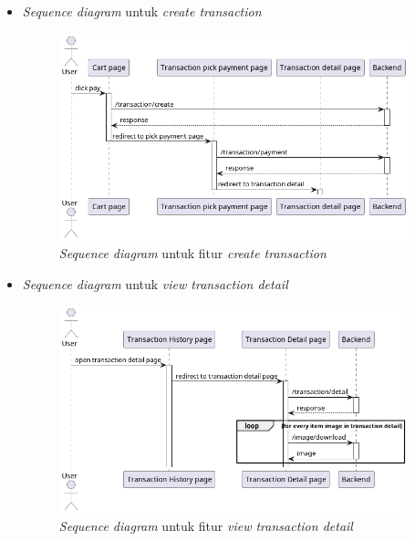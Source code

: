 \documentclass[a4paper]{article}
\begin{document}
\begin{enumerate}
\begin{enumerate}
\begin{itemize}
            \newpage
            \item \textit{Sequence diagram} untuk \textit{create transaction}
            \begin{figure}[h]
                \centering
                \includegraphics*[height=6cm]{diagram/sequence diagram/FE/15. transaction/create transaction/create transaction.png}
                \caption{\textit{Sequence diagram} untuk fitur \textit{create transaction}}
            \end{figure}

            \item \textit{Sequence diagram} untuk \textit{view transaction detail}
            \begin{figure}[h]
                \centering
                \includegraphics*[height=6cm]{diagram/sequence diagram/FE/15. transaction/view transaction detail/template.png}
                \caption{\textit{Sequence diagram} untuk fitur \textit{view transaction detail}}
            \end{figure}


\end{itemize}
\end{enumerate}
\end{enumerate}
\end{document}
